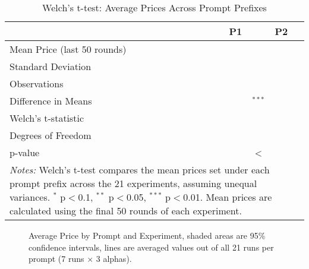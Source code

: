 \appendix
\begin{table}[htpb!]
    \centering
    \caption{Welch’s t-test: Average Prices Across Prompt Prefixes}
    \label{tab:welch_test_1}
    \begin{tabular}{lcc}
    \toprule
    & P1 & P2 \\
    \midrule
    Mean Price (last 50 rounds) &  &  \\
    Standard Deviation          &  &  \\
    Observations                &  &  \\
    \midrule
    Difference in Means         & \multicolumn{2}{c}{$^{***}$} \\
    Welch's t-statistic         & \multicolumn{2}{c}{} \\
    Degrees of Freedom          & \multicolumn{2}{c}{} \\
    p-value                     & \multicolumn{2}{c}{<} \\
    \bottomrule
    \multicolumn{3}{p{0.9\linewidth}}{\footnotesize \textit{Notes:} Welch’s t-test compares the mean prices set under each prompt prefix across the 21 experiments, assuming unequal variances. $^{*}$ p$<$0.1, $^{**}$ p$<$0.05, $^{***}$ p$<$0.01. Mean prices are calculated using the final 50 rounds of each experiment.}
    \end{tabular}
\end{table}



\begin{figure}[htpb]
    \centering
    
    \caption{Average Price by Prompt and Experiment, shaded areas are 95\% confidence intervals, lines are averaged values out of all 21 runs per prompt (7 runs $\times$ 3 alphas).}
    \label{fig:ts_prices_comb}
\end{figure}